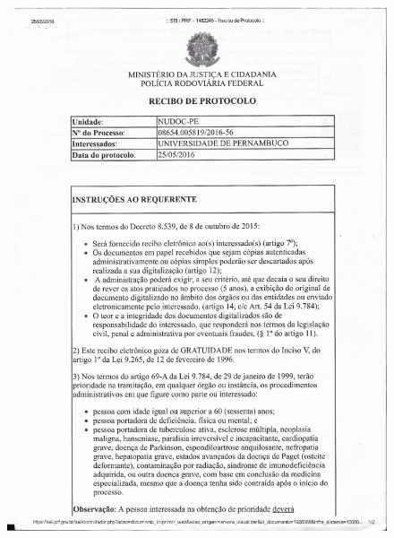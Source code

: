 \begin{figure}[ht!]
		\includegraphics[scale=0.30]{Figuras/Anexos/A1-PRFDadospg_004.pdf}
		\qquad \quad \quad

\end{figure}
